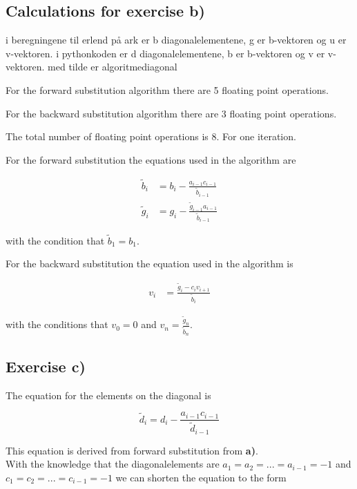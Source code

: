 \documentclass{article}
\begin{document}
  \subsection{Calculations for exercise b)}


    i beregningene til erlend på ark er b diagonalelementene, g er b-vektoren og u er v-vektoren. i pythonkoden er d diagonalelementene, b er b-vektoren og v er v-vektoren. med tilde er algoritmediagonal

    For the forward substitution algorithm there are 5 floating point operations.

    For the backward substitution algorithm there are 3 floating point operations.

    The total number of floating point operations is 8. For one iteration.

    For the forward substitution the equations used in the algorithm are

    \begin{align*}
      \tilde{b}_i &= b_i - \frac{a_{i-1} c_{i-1}}{\tilde{b} _{i-1}} \\
      \tilde{g}_i &= g_i - \frac{\tilde{g}_{i-1} a_{i-1}}{\tilde{b}_{i-1}}
    \end{align*}

    with the condition that $\tilde{b}_1 = b_1$.

    For the backward substitution the equation used in the algorithm is

    \begin{align*}
      v_i &= \frac{\tilde{g}_i - c_i v_{i+1}}{\tilde{b}_i}
    \end{align*}

    with the conditions that $v_0 = 0$ and $v_n = \frac{\tilde{g}_n}{\tilde{b}_n}$.

  \subsection{Exercise c)}

    The equation for the elements on the diagonal is

    \begin{equation*}
      \tilde{d}_i = d_i - \frac{a_{i-1} c_{i-1}}{\tilde{d}_{i-1}}
    \end{equation*}

    This equation is derived from forward substitution from \textbf{a)}. \\

    With the knowledge that the diagonalelements are $a_1 = a_2 = ... = a_{i-1} = -1 $ and $c_1 = c_2 = ... = c_{i-1} = -1$ we can shorten the equation to the form
\end{document}
